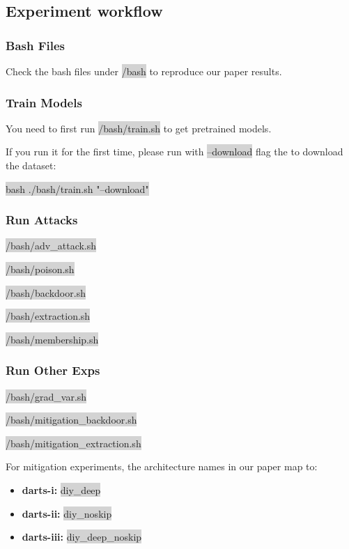 \documentclass[letterpaper,twocolumn,10pt]{article}
\begin{document}
{{{{%
\subsection{Experiment workflow}
\subsubsection*{Bash Files}
Check the bash files under \colorbox{lightgray}{/bash} to reproduce our paper results.
\subsubsection*{Train Models}
You need to first run \colorbox{lightgray}{/bash/train.sh} to get pretrained models.

If you run it for the first time, please run with \colorbox{lightgray}{--download} flag the to download the dataset:

\colorbox{lightgray}{bash ./bash/train.sh "--download"}

\subsubsection*{Run Attacks}
\noindent
\colorbox{lightgray}{/bash/adv\_attack.sh}

\noindent
\colorbox{lightgray}{/bash/poison.sh}

\noindent
\colorbox{lightgray}{/bash/backdoor.sh}

\noindent
\colorbox{lightgray}{/bash/extraction.sh}

\noindent
\colorbox{lightgray}{/bash/membership.sh}

\subsubsection*{Run Other Exps}
\noindent
\colorbox{lightgray}{/bash/grad\_var.sh}

\noindent
\colorbox{lightgray}{/bash/mitigation\_backdoor.sh}

\noindent
\colorbox{lightgray}{/bash/mitigation\_extraction.sh}

For mitigation experiments, the architecture names in our paper map to:

{\small
\begin{itemize}
    \item {\bf darts-i: } \colorbox{lightgray}{diy\_deep}
    \item {\bf darts-ii: } \colorbox{lightgray}{diy\_noskip}
    \item {\bf darts-iii: } \colorbox{lightgray}{diy\_deep\_noskip}
\end{itemize}

}}}}}
\end{document}
